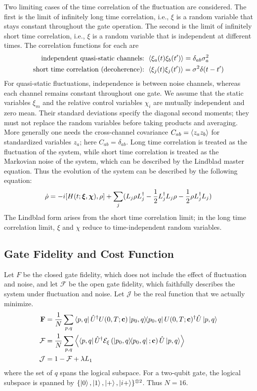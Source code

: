 \documentclass{simple-notes}
\newcommand{\closef}{\mathbf{F}}
\newcommand{\openf}{\mathcal{F}}
\begin{document}
Two limiting cases of the time correlation of the fluctuation are considered. The first is the limit of infinitely long time correlation, i.e., $\xi$ is a random variable that stays constant throughout the gate operation. The second is the limit of infinitely short time correlation, i.e., $\xi$ is a random variable that is independent at different times.
The correlation functions for each are
\begin{align}
    \text{independent quasi-static channels: } &\expval{\xi_a(t)\xi_b(t')} = \delta_{ab}\sigma_a^2 \\
    \text{short time correlation (decoherence): } &\expval{\xi_j(t)\xi_j(t')} = \sigma^2 \delta(t - t')
\end{align}
For quasi-static fluctuations, independence is between noise channels, whereas
each channel remains constant throughout one gate. We assume that the static
variables $\xi_m$ and the relative control variables $\chi_i$ are mutually
independent and zero mean. Their standard deviations specify the diagonal
second moments; they must not replace the random variables before taking
products and averaging. More generally one needs the cross-channel covariance
$C_{ab}=\expval{z_a z_b}$ for standardized variables $z_a$; here $C_{ab}=\delta_{ab}$.
Long time correlation is treated as the fluctuation of the system, while short time correlation is treated as the Markovian noise of the system, which can be described by the Lindblad master equation.
Thus the evolution of the system can be described by the following equation:
\begin{equation}
    \dot \rho = -i[H(t; \vb* \xi, \vb* \chi), \rho] + \sum_j  (L_j \rho L_j^\dagger - \frac{1}{2} L_j^\dagger L_j \rho - \frac{1}{2} \rho L_j^\dagger L_j)
\end{equation}
The Lindblad form arises from the short time correlation limit; in the long time correlation limit, $\xi$ and $\chi$ reduce to time-independent random variables.

\subsection{Gate Fidelity and Cost Function}
Let $F$ be the closed gate fidelity, which does not include the effect of fluctuation and noise, and let $\mathcal{F}$ be the open gate fidelity, which faithfully describes the system under fluctuation and noise. Let $\mathcal{J}$ be the real function that we actually minimize.
\begin{align*}
    \closef &= \frac{1}{N} \sum_{p,q}\bra{p,q}\hat U^\dagger U(0, T; \vb c)\ketbra{p_0,q} U(0, T; \vb c)^\dagger \hat U \ket{p,q}\\
    \openf &= \frac{1}{N} \sum_{p,q}\expval{\bra{p,q}\hat U^\dagger {\mathcal{E}_\xi}\left(\ketbra{p_0,q};\vb c\right)\hat U \ket{p,q}}\\
    \mathcal{J} &= 1 - \openf + \lambda L_1
\end{align*}
where the set of $q$ spans the logical subspace. For a two-qubit gate, the logical subspace is spanned by $\{\ket{0}, \ket{1}, \ket{+}, \ket{i+}\}^{\otimes 2}$. Thus $N = 16$.
\end{document}
